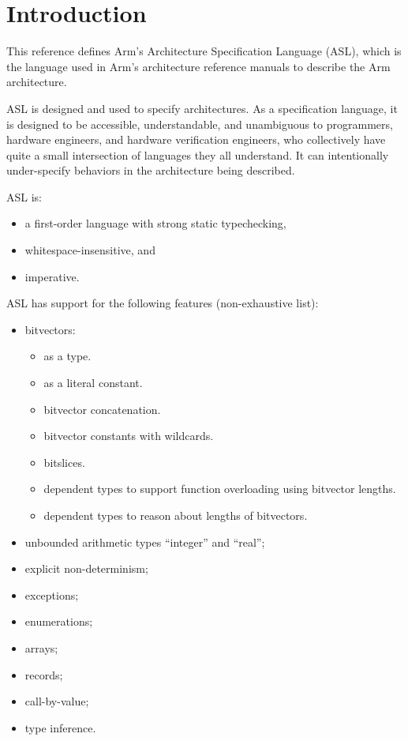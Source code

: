 \chapter{Introduction\label{chap:Introduction}}

This reference defines Arm’s Architecture Specification Language (ASL), which is the language
used in Arm’s architecture reference manuals to describe the Arm architecture.

ASL is designed and used to specify architectures. As a specification language, it is designed to be accessible,
understandable, and unambiguous to programmers, hardware
engineers, and hardware verification engineers, who collectively have quite a small intersection of languages they
all understand. It can intentionally under-specify behaviors in the architecture being described.

ASL is:
\begin{itemize}
    \item a first-order language with strong static typechecking,
    \item whitespace-insensitive, and
    \item imperative.
\end{itemize}

ASL has support for the following features (non-exhaustive list):
\begin{itemize}
    \item bitvectors:
    \begin{itemize}
        \item as a type.
        \item as a literal constant.
        \item bitvector concatenation.
        \item bitvector constants with wildcards.
        \item bitslices.
        \item dependent types to support function overloading using bitvector lengths.
        \item dependent types to reason about lengths of bitvectors.
    \end{itemize}
    \item unbounded arithmetic types “integer” and “real”;
    \item explicit non-determinism;
    \item exceptions;
    \item enumerations;
    \item arrays;
    \item records;
    \item call-by-value;
    \item type inference.
\end{itemize}

